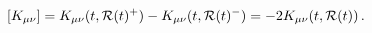 \begin{equation}\label{mirror}
[K_{\mu\nu}] = K_{\mu\nu} (t,{\cal R}(t)^+) - K_{\mu\nu} (t,{\cal
  R}(t)^-) = -2K_{\mu\nu} (t,{\cal R}(t)) \, .
\end{equation}

